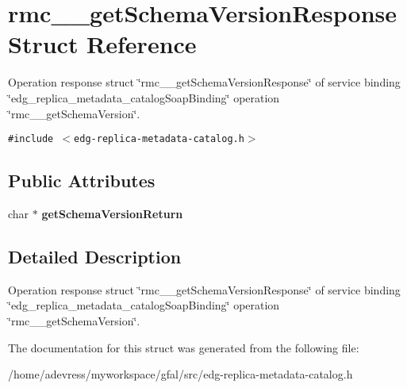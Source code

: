 \section{rmc\_\-\_\-get\-Schema\-Version\-Response Struct Reference}
\label{structrmc____getSchemaVersionResponse}
Operation response struct \char`\"{}rmc\_\-\_\-get\-Schema\-Version\-Response\char`\"{} of service binding \char`\"{}edg\_\-replica\_\-metadata\_\-catalog\-Soap\-Binding\char`\"{} operation \char`\"{}rmc\_\-\_\-get\-Schema\-Version\char`\"{}.  


{\tt \#include $<$edg-replica-metadata-catalog.h$>$}

\subsection*{Public Attributes}
\begin{CompactItemize}
\item 
char $\ast$ \textbf{get\-Schema\-Version\-Return}\label{structrmc____getSchemaVersionResponse_9ba984e17f0b4ead85aaf1871a576962}

\end{CompactItemize}


\subsection{Detailed Description}
Operation response struct \char`\"{}rmc\_\-\_\-get\-Schema\-Version\-Response\char`\"{} of service binding \char`\"{}edg\_\-replica\_\-metadata\_\-catalog\-Soap\-Binding\char`\"{} operation \char`\"{}rmc\_\-\_\-get\-Schema\-Version\char`\"{}. 



The documentation for this struct was generated from the following file:\begin{CompactItemize}
\item 
/home/adevress/myworkspace/gfal/src/edg-replica-metadata-catalog.h\end{CompactItemize}
